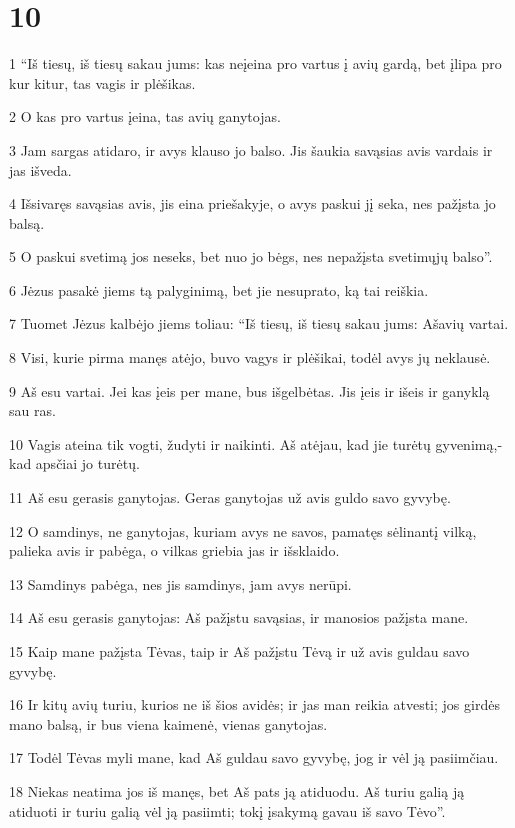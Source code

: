 \chapter{10}


\par 1 “Iš tiesų, iš tiesų sakau jums: kas neįeina pro vartus į avių gardą, bet įlipa pro kur kitur, tas vagis ir plėšikas. 
\par 2 O kas pro vartus įeina, tas avių ganytojas. 
\par 3 Jam sargas atidaro, ir avys klauso jo balso. Jis šaukia savąsias avis vardais ir jas išveda. 
\par 4 Išsivaręs savąsias avis, jis eina priešakyje, o avys paskui jį seka, nes pažįsta jo balsą. 
\par 5 O paskui svetimą jos neseks, bet nuo jo bėgs, nes nepažįsta svetimųjų balso”. 
\par 6 Jėzus pasakė jiems tą palyginimą, bet jie nesuprato, ką tai reiškia. 
\par 7 Tuomet Jėzus kalbėjo jiems toliau: “Iš tiesų, iš tiesų sakau jums: Aš­avių vartai. 
\par 8 Visi, kurie pirma manęs atėjo, buvo vagys ir plėšikai, todėl avys jų neklausė. 
\par 9 Aš esu vartai. Jei kas įeis per mane, bus išgelbėtas. Jis įeis ir išeis ir ganyklą sau ras. 
\par 10 Vagis ateina tik vogti, žudyti ir naikinti. Aš atėjau, kad jie turėtų gyvenimą,­kad apsčiai jo turėtų. 
\par 11 Aš esu gerasis ganytojas. Geras ganytojas už avis guldo savo gyvybę. 
\par 12 O samdinys, ne ganytojas, kuriam avys ne savos, pamatęs sėlinantį vilką, palieka avis ir pabėga, o vilkas griebia jas ir išsklaido. 
\par 13 Samdinys pabėga, nes jis samdinys, jam avys nerūpi. 
\par 14 Aš esu gerasis ganytojas: Aš pažįstu savąsias, ir manosios pažįsta mane. 
\par 15 Kaip mane pažįsta Tėvas, taip ir Aš pažįstu Tėvą ir už avis guldau savo gyvybę. 
\par 16 Ir kitų avių turiu, kurios ne iš šios avidės; ir jas man reikia atvesti; jos girdės mano balsą, ir bus viena kaimenė, vienas ganytojas. 
\par 17 Todėl Tėvas myli mane, kad Aš guldau savo gyvybę, jog ir vėl ją pasiimčiau. 
\par 18 Niekas neatima jos iš manęs, bet Aš pats ją atiduodu. Aš turiu galią ją atiduoti ir turiu galią vėl ją pasiimti; tokį įsakymą gavau iš savo Tėvo”. 
